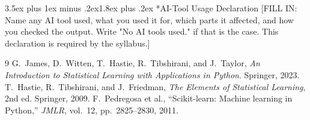\documentclass[10pt,twocolumn,letterpaper]{article}
\makeatletter
\renewcommand\section{\@startsection{section}{1}{\z@}%
  {3.5ex plus 1ex minus .2ex}{1.8ex plus .2ex}%
  {\centering\normalfont\normalsize\scshape}}
\makeatother
\begin{document}
\section*{AI-Tool Usage Declaration}
[FILL IN: Name any AI tool used, what you used it for, which parts it
affected, and how you checked the output. Write "No AI tools used." if
that is the case. This declaration is required by the syllabus.]

\begin{thebibliography}{9}
 G.~James, D.~Witten, T.~Hastie, R.~Tibshirani, and J.~Taylor,
  \textit{An Introduction to Statistical Learning with Applications in Python}. Springer, 2023.
 T.~Hastie, R.~Tibshirani, and J.~Friedman,
  \textit{The Elements of Statistical Learning}, 2nd ed. Springer, 2009.
 F.~Pedregosa et al., ``Scikit-learn: Machine learning in Python,''
  \textit{JMLR}, vol.~12, pp.~2825--2830, 2011.
\end{thebibliography}
\end{document}
